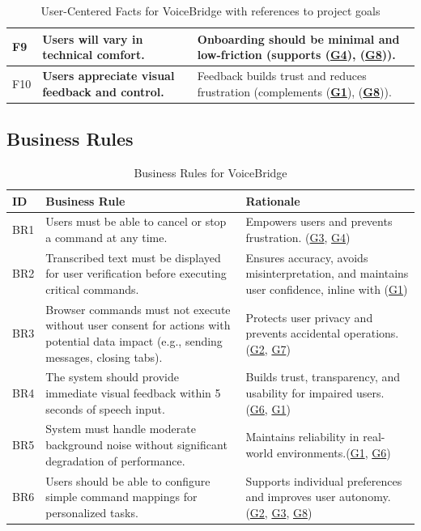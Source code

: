 \documentclass[11pt]{article}
\begin{document}
\begin{table}[H]
\begin{tabularx}{\textwidth}{p{1cm}p{6cm}X}
F9 & \textbf{Users will vary in technical comfort.} & Onboarding should be minimal and low-friction (supports (\textbf{\hyperref[tab:project-goals]{G4}}), (\textbf{\hyperref[tab:project-goals]{G8}})). \\ \hline
F10 & \textbf{Users appreciate visual feedback and control.} & Feedback builds trust and reduces frustration (complements (\textbf{\hyperref[tab:project-goals]{G1}}), (\textbf{\hyperref[tab:project-goals]{G8}})). \\
\bottomrule
\end{tabularx}
\caption{User-Centered Facts for VoiceBridge with references to project goals}
\label{tab:user-facts}
\end{table}



\subsection{Business Rules}

\begin{table}[H]
\centering
\begin{tabularx}{\textwidth}{p{1cm} X X}
\toprule
\textbf{ID} & \textbf{Business Rule} & \textbf{Rationale} \\
\midrule
BR1 & Users must be able to cancel or stop a command at any time. & Empowers users and prevents frustration. (\hyperref[tab:project-goals]{G3}, \hyperref[tab:project-goals]{G4}) \\
BR2 & Transcribed text must be displayed for user verification before executing critical commands. & Ensures accuracy, avoids misinterpretation, and maintains user confidence, inline with (\hyperref[tab:project-goals]{G1}) \\
BR3 & Browser commands must not execute without user consent for actions with potential data impact (e.g., sending messages, closing tabs). & Protects user privacy and prevents accidental operations. (\hyperref[tab:project-goals]{G2}, \hyperref[tab:project-goals]{G7}) \\
BR4 & The system should provide immediate visual feedback within 5 seconds of speech input. & Builds trust, transparency, and usability for impaired users. (\hyperref[tab:project-goals]{G6}, \hyperref[tab:project-goals]{G1}) \\
BR5 & System must handle moderate background noise without significant degradation of performance. & Maintains reliability in real-world environments.(\hyperref[tab:project-goals]{G1}, \hyperref[tab:project-goals]{G6}) \\
BR6 & Users should be able to configure simple command mappings for personalized tasks. & Supports individual preferences and improves user autonomy. (\hyperref[tab:project-goals]{G2}, \hyperref[tab:project-goals]{G3}, \hyperref[tab:project-goals]{G8}) \\
\bottomrule
\end{tabularx}
\caption{Business Rules for VoiceBridge}
\label{tab:business-rules}
\end{table}
\end{document}
